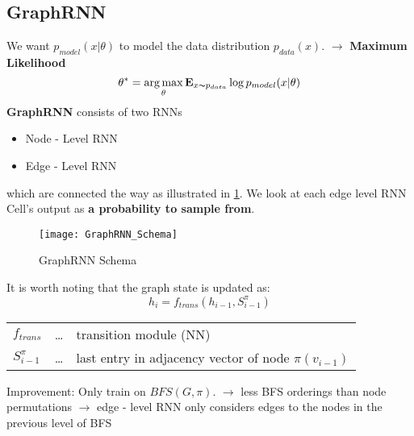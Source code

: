 \documentclass[parskip=full]{scrartcl}
\DeclareMathOperator*{\argmax}{arg\, max}
\begin{document}
\subsection{GraphRNN \cite{you2018graphrnn}}
We want $p_{model}(x \vert \theta)$ to model the data distribution $p_{data}(x)$. $\rightarrow$ \textbf{Maximum Likelihood}
\[\theta^* = \argmax_{\theta} \mathbf{E}_{x \thicksim p_{data}} \log p_{model}(x \vert \theta)\]
\textbf{GraphRNN} consists of two RNNs
\begin{itemize}
	\item[] Node - Level RNN
	\item[] Edge - Level RNN
\end{itemize}
which are connected the way as illustrated in \cref{fig:GraphRNN0}.
We look at each edge level RNN Cell's output as \textbf{a probability to sample from}.
\begin{figure}[h]
	\centering
	\texttt{[image: GraphRNN\_Schema]}
	\caption{GraphRNN Schema \cite{you2018graphrnn}}
	\label{fig:GraphRNN0}
\end{figure}

It is worth noting that the graph state is updated as:
\[h_i = f_{trans}(h_{i-1},S_{i-1}^{\pi})\]
\begin{center}
\begin{tabular}{l c l}
	$f_{trans}$ & \dots & transition module (NN) \\
	$S_{i-1}^{\pi}$ & \dots & last entry in adjacency vector of node $\pi (v_{i-1})$
\end{tabular}
\end{center}
Improvement: Only train on $BFS(G, \pi)$.\newline 
$\rightarrow$ less BFS orderings than node permutations\newline
$\rightarrow$ edge - level RNN only considers edges to the nodes in the previous level of BFS

\newpage
\printnoidxglossary

\newpage
\printbibliography
\end{document}

